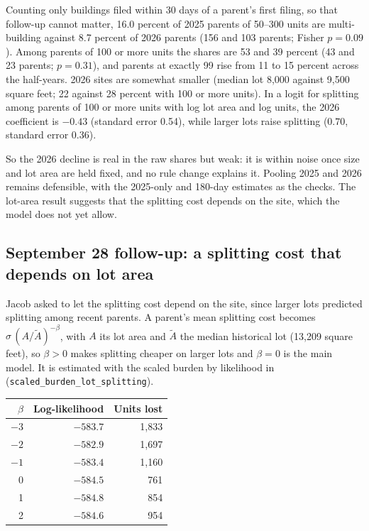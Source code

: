 Counting only buildings filed within 30 days of a parent's first filing, so
that follow-up cannot matter, 16.0 percent of 2025 parents of 50--300 units
are multi-building against 8.7 percent of 2026 parents (156 and 103 parents;
Fisher $p=0.09$). Among parents of 100 or more units the shares are 53 and 39
percent (43 and 23 parents; $p=0.31$), and parents at exactly 99 rise from 11
to 15 percent across the half-years. 2026 sites are somewhat smaller (median
lot 8,000 against 9,500 square feet; 22 against 28 percent with 100 or more
units). In a logit for splitting among parents of 100 or more units with log
lot area and log units, the 2026 coefficient is $-0.43$ (standard error 0.54),
while larger lots raise splitting ($0.70$, standard error 0.36).

So the 2026 decline is real in the raw shares but weak: it is within noise
once size and lot area are held fixed, and no rule change explains it.
Pooling 2025 and 2026 remains defensible, with the 2025-only and 180-day
estimates as the checks. The lot-area result suggests that the splitting
cost depends on the site, which the model does not yet allow.

\subsection*{September 28 follow-up: a splitting cost that depends on lot area}

Jacob asked to let the splitting cost depend on the site, since larger lots
predicted splitting among recent parents. A parent's mean splitting cost
becomes $\sigma\,(A/\tilde A)^{-\beta}$, with $A$ its lot area and $\tilde A$
the median historical lot (13,209 square feet), so $\beta>0$ makes splitting
cheaper on larger lots and $\beta=0$ is the main model. It is estimated with
the scaled burden by likelihood in 
(\texttt{scaled\_burden\_lot\_splitting}).

\begin{center}
\small
\begin{tabular}{rrr}
\hline
$\beta$ & Log-likelihood & Units lost \\
\hline
$-3$ & $-583.7$ & 1,833 \\
$-2$ & $-582.9$ & 1,697 \\
$-1$ & $-583.4$ & 1,160 \\
0 & $-584.5$ & 761 \\
1 & $-584.8$ & 854 \\
2 & $-584.6$ & 954 \\
\hline
\end{tabular}
\end{center}

